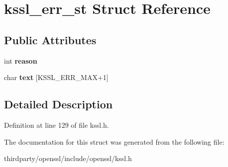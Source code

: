 \hypertarget{structkssl__err__st}{}\section{kssl\+\_\+err\+\_\+st Struct Reference}
\label{structkssl__err__st}
\subsection*{Public Attributes}
\begin{DoxyCompactItemize}
\item 
\mbox{\label{structkssl__err__st_a23922add87a55b59b3bd56d4b6fc4384}} 
int {\bfseries reason}
\item 
\mbox{\label{structkssl__err__st_a2432fe3f3f02f5319bf7da930cc356bc}} 
char {\bfseries text} \mbox{[}K\+S\+S\+L\+\_\+\+E\+R\+R\+\_\+\+M\+AX+1\mbox{]}
\end{DoxyCompactItemize}


\subsection{Detailed Description}


Definition at line 129 of file kssl.\+h.



The documentation for this struct was generated from the following file\+:\begin{DoxyCompactItemize}
\item 
thirdparty/openssl/include/openssl/kssl.\+h\end{DoxyCompactItemize}
